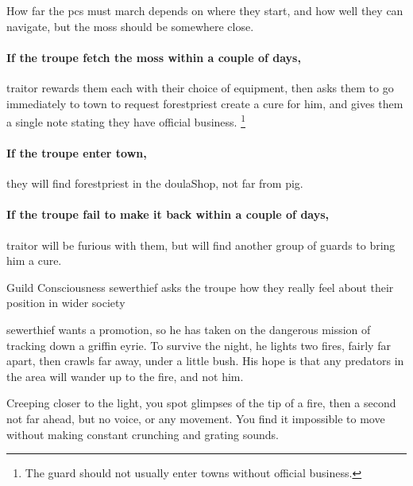 How far the \glspl{pc} must march depends on where they start, and how well they can navigate,%
but the moss should be somewhere close.

\paragraph{If the troupe fetch the moss within a couple of days,}
\gls{traitor} rewards them each with their choice of equipment, then asks them to go immediately to \gls{town} to request \gls{forestpriest} create a cure for him, and gives them a single note stating they have official business.%
\footnote{The \gls{guard} should not usually enter towns without official business.}

\paragraph{If the troupe enter \gls{town},}
they will find \gls{forestpriest} in the \gls{doulaShop}, not far from \gls{pig}.

\paragraph{If the troupe fail to make it back within a couple of days,}
\gls{traitor} will be furious with them, but will find another group of \glspl{guard} to bring him a cure.

{Guild Consciousness}%
{\gls{sewerthief} asks the troupe how they really feel about their position in wider society}%

\Gls{sewerthief} wants a promotion, so he has taken on the dangerous mission of tracking down a griffin eyrie.
To survive the night, he lights two fires, fairly far apart, then crawls far away, under a little bush.
His hope is that any predators in the area will wander up to the fire, and not him.

\begin{boxtext}
  Creeping closer to the light, you spot glimpses of the tip of a fire, then a second not far ahead, but no voice, or any movement.
  You find it impossible to move without making constant crunching and grating sounds.
\end{boxtext}

\renewcommand\npcQuote{What was that?\ldots maybe the wind.
The wind is always playing tricks on me.}

\sewerthief

